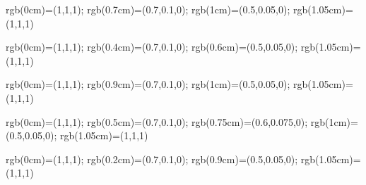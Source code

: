 \documentclass{article}
\begin{document}

% 
{rgb(0cm)=(1,1,1);
rgb(0.7cm)=(0.7,0.1,0); rgb(1cm)=(0.5,0.05,0); rgb(1.05cm)=(1,1,1)}

% 
{rgb(0cm)=(1,1,1);
rgb(0.4cm)=(0.7,0.1,0); rgb(0.6cm)=(0.5,0.05,0); rgb(1.05cm)=(1,1,1)}


% 
{rgb(0cm)=(1,1,1);
rgb(0.9cm)=(0.7,0.1,0); rgb(1cm)=(0.5,0.05,0); rgb(1.05cm)=(1,1,1)}


% 
{rgb(0cm)=(1,1,1);
rgb(0.5cm)=(0.7,0.1,0); rgb(0.75cm)=(0.6,0.075,0); rgb(1cm)=(0.5,0.05,0); rgb(1.05cm)=(1,1,1)}

% 
{rgb(0cm)=(1,1,1);
rgb(0.2cm)=(0.7,0.1,0); rgb(0.9cm)=(0.5,0.05,0); rgb(1.05cm)=(1,1,1)}


\end{document}
